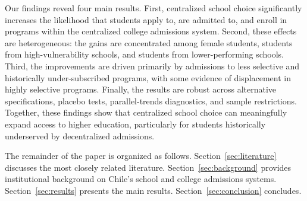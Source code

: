 Our findings reveal four main results. First, centralized school choice significantly increases the likelihood that students apply to, are admitted to, and enroll in programs within the centralized college admissions system. Second, these effects are heterogeneous: the gains are concentrated among female students, students from high-vulnerability schools, and students from lower-performing schools. Third, the improvements are driven primarily by admissions to less selective and historically under-subscribed programs, with some evidence of displacement in highly selective programs. Finally, the results are robust across alternative specifications, placebo tests, parallel-trends diagnostics, and sample restrictions. Together, these findings show that centralized school choice can meaningfully expand access to higher education, particularly for students historically underserved by decentralized admissions.


The remainder of the paper is organized as follows. 
Section~\ref{sec:literature} discusses the most closely related literature. Section~\ref{sec:background} provides institutional background on Chile's school and college admissions systems. Section~\ref{sec:results} presents the main results. Section~\ref{sec:conclusion} concludes.




